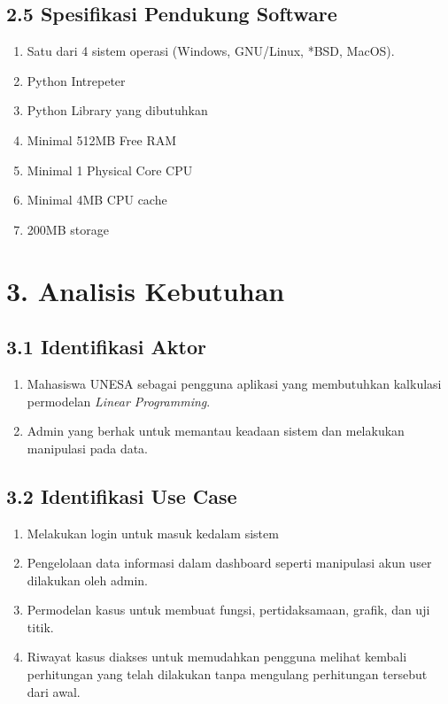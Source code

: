 \documentclass[a4paper]{article}
\begin{document}
    \subsection*{2.5 Spesifikasi Pendukung Software}
    \begin{enumerate}
        \item Satu dari 4 sistem operasi (Windows, GNU/Linux, *BSD, MacOS).
        \item Python Intrepeter
        \item Python Library yang dibutuhkan
        \item Minimal 512MB Free RAM 
        \item Minimal 1 Physical Core CPU
        \item Minimal 4MB CPU cache
        \item 200MB storage
    \end{enumerate}
\section*{3. Analisis Kebutuhan}
    \subsection*{3.1 Identifikasi Aktor}
    \begin{enumerate}
        \item Mahasiswa UNESA sebagai pengguna aplikasi yang
        membutuhkan kalkulasi permodelan \textit{Linear Programming}.
        \item Admin yang berhak untuk memantau keadaan sistem 
        dan melakukan manipulasi pada data.
    \end{enumerate}
    \subsection*{3.2 Identifikasi Use Case}
    \begin{enumerate}
        \item Melakukan login untuk masuk kedalam sistem
        \item Pengelolaan data informasi dalam dashboard
        seperti manipulasi akun user dilakukan oleh admin.
        \item Permodelan kasus untuk membuat fungsi, pertidaksamaan,
        grafik, dan uji titik.
        \item Riwayat kasus diakses untuk memudahkan pengguna melihat
        kembali perhitungan yang telah dilakukan tanpa mengulang
        perhitungan tersebut dari awal.
    \end{enumerate}
\end{document}
